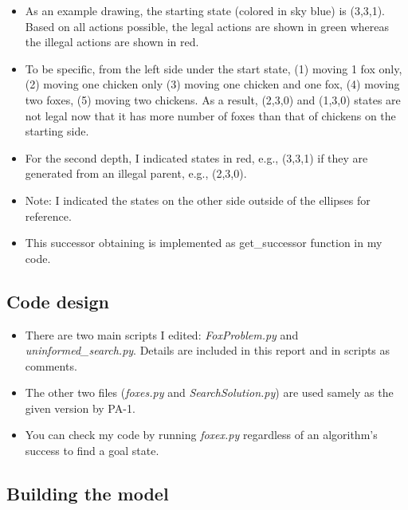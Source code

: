 \documentclass[]{article}
\providecommand{\tightlist}{%
  \setlength{\itemsep}{0pt}\setlength{\parskip}{0pt}}
\begin{document}
\begin{enumerate}
  \begin{itemize}
  \tightlist
  \item
    As an example drawing, the starting state (colored in sky blue) is
    (3,3,1). Based on all actions possible, the legal actions are shown
    in green whereas the illegal actions are shown in red.
  \item
    To be specific, from the left side under the start state, (1) moving
    1 fox only, (2) moving one chicken only (3) moving one chicken and
    one fox, (4) moving two foxes, (5) moving two chickens. As a result,
    (2,3,0) and (1,3,0) states are not legal now that it has more number
    of foxes than that of chickens on the starting side.
  \item
    For the second depth, I indicated states in red, e.g., (3,3,1) if
    they are generated from an illegal parent, e.g., (2,3,0).
  \item
    Note: I indicated the states on the other side outside of the
    ellipses for reference.
  \item
    This successor obtaining is implemented as get\_successor function
    in my code.
  \end{itemize}
\end{enumerate}

\subsection{Code design}\label{code-design}

\begin{itemize}
\tightlist
\item
  There are two main scripts I edited: \emph{FoxProblem.py} and
  \emph{uninformed\_search.py}. Details are included in this report and
  in scripts as comments.
\item
  The other two files (\emph{foxes.py} and \emph{SearchSolution.py}) are
  used samely as the given version by PA-1.
\item
  You can check my code by running \emph{foxex.py} regardless of an
  algorithm's success to find a goal state.
\end{itemize}

\subsection{Building the model}\label{building-the-model}
\end{document}

